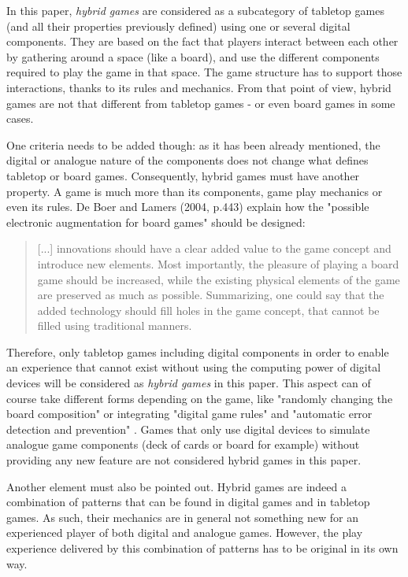 In this paper, \textit{hybrid games} are considered as a subcategory of tabletop games (and all their properties previously defined) using one or several digital components. They are based on the fact that players interact between each other by gathering around a space (like a board), and use the different components required to play the game in that space. The game structure has to support those interactions, thanks to its rules and mechanics. From that point of view, hybrid games are not that different from tabletop games - or even board games in some cases.

One criteria needs to be added though: as it has been already mentioned, the digital or analogue nature of the components does not change what defines tabletop or board games. Consequently, hybrid games must have another property. A game is much more than its components, game play mechanics or even its rules. De Boer and Lamers (2004, p.443)\cite{chap:aug} explain how the "possible electronic augmentation for board games" should be designed:

\begin{quotation}
[...] innovations should have a clear added value to the game concept and introduce new elements. Most importantly, the pleasure of playing a board game should be increased, while the existing physical elements of the game are preserved as much as possible. Summarizing, one could say that the added technology should fill holes in the game concept, that cannot be filled using traditional manners.
\end{quotation}

Therefore, only tabletop games including digital components in order to enable an experience that cannot exist without using the computing power of digital devices will be considered as \textit{hybrid games} in this paper. This aspect can of course take different forms depending on the game, like "randomly changing the board composition" or integrating "digital game rules" and "automatic error detection and prevention" \cite{chap:aug}. Games that only use digital devices to simulate analogue game components (deck of cards or board for example) without providing any new feature are not considered hybrid games in this paper.

Another element must also be pointed out. Hybrid games are indeed a combination of patterns that can be found in digital games and in tabletop games. As such, their mechanics are in general not something new for an experienced player of both digital and analogue games. However, the play experience delivered by this combination of patterns has to be original in its own way.

